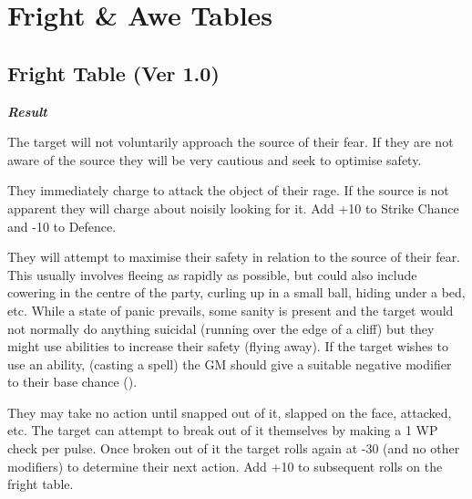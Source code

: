 \section{Fright \& Awe Tables}

\begin{multicols}{2}
\subsection{Fright Table (Ver 1.0)}
\label{tables:fright}

\begin{description}
\setlength\itemsep{0pt}
\item[{\em Dice}] {\bf \em Result}

\item[$<$ 20\hspace{1.0em}Wary]
The target will not voluntarily approach the source of their fear.  If
they are not aware of the source they will be very cautious and seek
to optimise safety.

\item[21--25\hspace{1.0em}Berserk]
They immediately charge to attack the object of their rage.  If the
source is not apparent they will charge about noisily looking for it.
Add +10 to Strike Chance and -10 to Defence.

\item[26--75\hspace{1.0em}Panic]
They will attempt to maximise their safety in relation to the source
of their fear.  This usually involves fleeing as rapidly as possible,
but could also include cowering in the centre of the party, curling up
in a small ball, hiding under a bed, etc.  While a state of panic
prevails, some sanity is present and the target would not normally do
anything suicidal (\eg running over the edge of a cliff) but they
might use abilities to increase their safety (\eg flying away).  If
the target wishes to use an ability, (\eg casting a spell) the GM
should give a suitable negative modifier to their base chance
().

\item[76--90\hspace{1.0em}Frozen]
They may take no action until snapped out of it, \eg slapped on the
face, attacked, etc.  The target can attempt to break out of it
themselves by making a 1 \x WP check per pulse.  Once broken out of it
the target rolls again at -30 (and no other modifiers) to determine
their next action.  Add +10 to subsequent rolls on the fright table.


\end{description}
\end{multicols}
